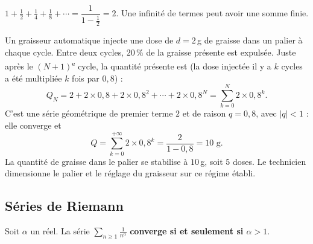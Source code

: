 \documentclass[a4paper,11pt]{article}
\begin{document}
\begin{exemple}\label{ex:zenon}
$1 + \frac12 + \frac14 + \frac18 + \cdots = \dfrac{1}{1-\frac12} = 2$. Une infinité de termes peut avoir une somme finie.
\end{exemple}

\begin{appliindus}\label{ex:graisse}
Un graisseur automatique injecte une dose de $d = 2$\,g de graisse dans un palier à chaque cycle. Entre deux cycles, $20\,\%$ de la graisse présente est expulsée. Juste après le $(N+1)$\textsuperscript{e} cycle, la quantité présente est (la dose injectée il y a $k$ cycles a été multipliée $k$ fois par $0{,}8$) :
\[
Q_N = 2 + 2\times 0{,}8 + 2\times 0{,}8^2 + \cdots + 2\times 0{,}8^{N} = \sum_{k=0}^{N} 2\times 0{,}8^{k}.
\]
C'est une série géométrique de premier terme $2$ et de raison $q = 0{,}8$, avec $|q|<1$ : elle converge et
\[
Q = \sum_{k=0}^{+\infty} 2\times 0{,}8^{k} = \frac{2}{1-0{,}8} = 10 \text{ g.}
\]
La quantité de graisse dans le palier se stabilise à $10$\,g, soit $5$ doses. Le technicien dimensionne le palier et le réglage du graisseur sur ce régime établi.
\end{appliindus}

\subsection{Séries de Riemann}\label{subsec:riemann}

\begin{theoreme}\label{th:riemann}
Soit $\alpha$ un réel. La série $\displaystyle\sum_{n\geq 1}\frac{1}{n^{\alpha}}$ \textbf{converge si et seulement si $\alpha > 1$}.
\end{theoreme}
\end{document}
